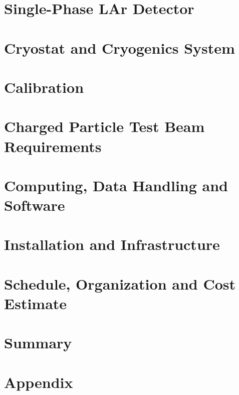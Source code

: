 \documentclass[12pt]{article}
\begin{document}
\section{Single-Phase LAr Detector} 
	


\section{Cryostat and Cryogenics System} %
	
	
\section{Calibration}
	

\section{Charged Particle Test Beam Requirements} %
	


\section{Computing, Data Handling and Software} %
	

\section{Installation and Infrastructure}  %
	
	
	
\section{Schedule, Organization and Cost Estimate} %
	

\newpage
\section{Summary}  %
	

\newpage



\newpage
\section*{Appendix}  %
	
\end{document}
